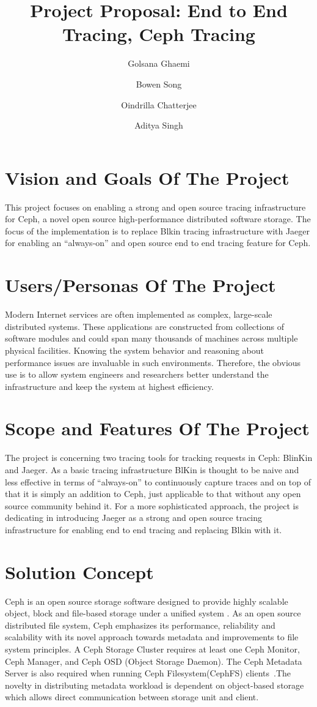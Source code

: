 \documentclass[a4paper, 11pt]{article}
\title{Project Proposal: End to End Tracing, Ceph Tracing}
\author[1]{Golsana Ghaemi}
\author[1]{Bowen Song}
\author[1]{Oindrilla Chatterjee}
\author[1]{Aditya Singh}
\affil[1]{Department of Electrical and Computer Engineering}
\affil[1]{Boston University}
\date{}
\begin{document}
\maketitle
\section{Vision and Goals Of The Project}

This project focuses on enabling a strong and open source tracing infrastructure for Ceph, a novel open source high-performance distributed software storage. The focus of the implementation is to replace Blkin tracing infrastructure with Jaeger for enabling an “always-on” and open source end to end tracing feature for Ceph.

\section{Users/Personas Of The Project}

Modern Internet services are often implemented as complex, large-scale distributed systems. These applications are constructed from collections of software modules and could span many thousands of machines across multiple physical facilities. Knowing the system behavior and reasoning about performance issues are invaluable in such environments\cite{Dapper}. Therefore, the obvious use is to allow system engineers and researchers better understand the infrastructure and keep the system at highest efficiency.


\section{Scope and Features Of The Project}

The project is concerning two tracing tools for tracking requests in Ceph: BlinKin and Jaeger. As a basic tracing infrastructure BlKin is thought to be naive and less effective in terms of “always-on” to continuously capture traces and on top of that it is simply an addition to Ceph, just applicable to that without any open source community behind it. For a more sophisticated approach, the project is dedicating in introducing Jaeger as a strong and open source tracing infrastructure for enabling end to end tracing and replacing Blkin with it.


\section{Solution Concept}
Ceph is an open source storage software designed to provide highly scalable object, block and file-based storage under a unified system \cite{ceph_home}. As an open source distributed file system, Ceph emphasizes its performance, reliability and scalability with its novel approach towards metadata and improvements to file system principles. A Ceph Storage Cluster requires at least one Ceph Monitor, Ceph Manager, and Ceph OSD (Object Storage Daemon). The Ceph Metadata Server is also required when running Ceph Filesystem(CephFS) clients~\cite{ceph_intro}.The novelty in distributing metadata workload is dependent on object-based storage which allows direct communication between storage unit and client.\\
\end{document}
